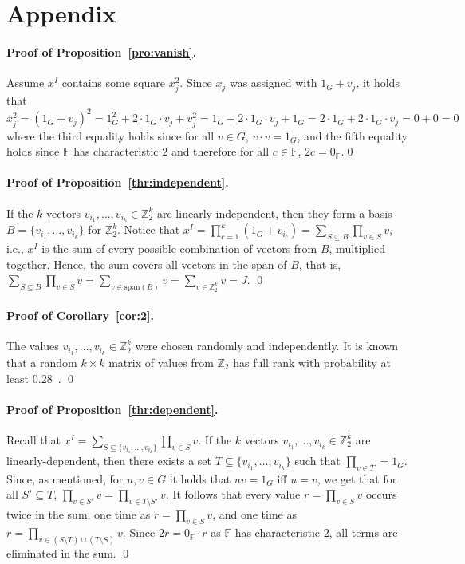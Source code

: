 \documentclass{llncs}
\newcommand{\SP}{\mathrm{span}}
\newcommand{\FF}{\mathbb{F}}
\newcommand{\ZZ}{\mathbb{Z}}
\begin{document}



\section*{Appendix}

\paragraph{Proof of Proposition~\ref{pro:vanish}.}
Assume $x^I$ contains some square $x_j^2$. Since $x_j$ was assigned with $1_G+v_j$, it holds that $x_j^2 = (1_G+v_j)^2 = 1_G^2 + 2 \cdot 1_G\cdot v_j + v_j^2 = 1_G + 2 \cdot  1_G \cdot v_j + 1_G = 2 \cdot  1_G+ 2 \cdot  1_G\cdot v_j = 0+0=0$ where the third equality holds since for all $v \in G$, $v\cdot v = 1_G$, and the fifth equality holds since $\FF$ has characteristic $2$ and therefore for all $c \in \FF$, $2c = 0_\FF$.\qed



\paragraph{Proof of Proposition~\ref{thr:independent}.}
If the $k$ vectors $v_{i_1}, \ldots , v_{i_k} \in \ZZ_2^k$ are linearly-independent, then they form a basis $B = \{v_{i_1}, \ldots , v_{i_k}\}$ for $\ZZ_2^k$. Notice that $x^I = \prod_{c=1}^k (1_G + v_{i_c}) = \sum_{S \subseteq B}\prod_{v \in S} v$, i.e., $x^I$ is the sum of every possible combination of vectors from $B$, multiplied together. Hence, the sum covers all vectors in the span of $B$, that is, $\sum_{S \subseteq B}\prod_{v \in S} v = \sum_{v \in \SP(B) }v = \sum_{v \in \ZZ_2^k}v = J$.
\qed

\paragraph{Proof of Corollary~\ref{cor:2}.}
The values $v_{i_1}, \ldots , v_{i_k} \in \ZZ_2^k$ were chosen randomly and independently. It is known that a random $k \times k$ matrix of values from $\ZZ_2$ has full rank with probability at least $0.28$~\cite{BK95}.
\qed

\paragraph{Proof of Proposition~\ref{thr:dependent}.}
Recall that $x^I = \sum_{S \subseteq \{v_{i_1},\ldots,v_{i_k}\}}\prod_{v \in S} v$. If the $k$ vectors $v_{i_1}, \ldots , v_{i_k} \in \ZZ_2^k$ are linearly-dependent, then there exists a set $T \subseteq \{v_{i_1}, \ldots , v_{i_k}\}$ such that $\prod_{v \in T} = 1_G$. Since, as mentioned, for $u,v \in G$ it holds that $uv = 1_G$ iff $u = v$, we get that for all $S' \subseteq T$, $\prod_{v \in S'}v = \prod_{v \in T\setminus S'}v$. It follows that every value $r = \prod_{v \in S}v$ occurs twice in the sum, one time as $r = \prod_{v \in S}v$, and one time as $r = \prod_{v \in (S \setminus T) \cup (T \setminus S)}v$. Since $2r=0_\FF \cdot r$ as $\FF$ has characteristic $2$, all terms are eliminated in the sum.
\qed
\end{document}
